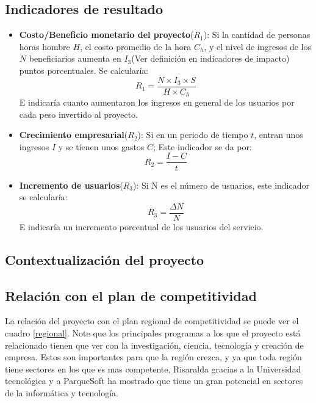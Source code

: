 \documentclass[a4paper, 12pt, oneside]{article}
\begin{document}
	\subsection{Indicadores de resultado}
	\begin{itemize}
		\item {\bf Costo/Beneficio monetario del proyecto}($R_1$): Si la cantidad de personas horas hombre $H$,
			el costo promedio de la hora $C_h$, y el nivel de ingresos de los $N$ beneficiarios aumenta en
			$I_3$(Ver definición en indicadores de impacto) puntos porcentuales. Se calcularía:
			\[R_1 = \frac{N \times I_3 \times S}{H \times C_h}\]
			E indicaría cuanto aumentaron los ingresos en general de los usuarios por cada peso invertido
			al proyecto.
		\item {\bf Crecimiento empresarial}($R_2$): Si en un periodo de tiempo $t$, entran unos ingresos $I$ y
			se tienen unos gastos $C$; Este indicador se da por:
			\[R_2 = \frac{I-C}{t}\]
		\item {\bf Incremento de usuarios}($R_3$): Si N es el número de usuarios, este indicador se calcularía:
			\[R_3 = \frac{\Delta N}{N}\]
			E indicaría un incremento porcentual de los usuarios del servicio.
	\end{itemize}
	\clearpage
	
	\begin{center}
	\section{Contextualización del proyecto}
	\end{center}
	
	\subsection{Relación con el plan de competitividad}
	La relación del proyecto con el plan regional de competitividad se puede ver el cuadro \ref{regional}. Note
	que los principales programas a los que el proyecto está relacionado tienen que ver con la investigación,
	ciencia, tecnología y creación de empresa. Estos son importantes para que la región crezca, y ya que toda
	región tiene sectores en los que es mas competente, Risaralda gracias a la Universidad tecnológica y a
	ParqueSoft ha mostrado que tiene un gran potencial en sectores de la informática y tecnología.
	
\end{document}
